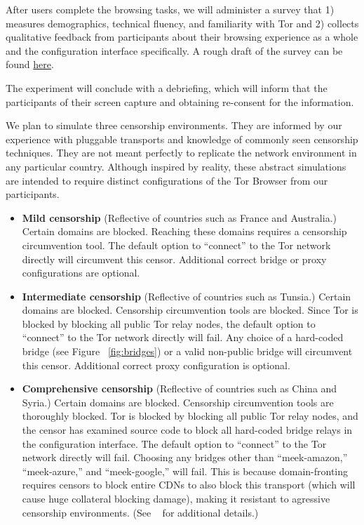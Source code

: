 \documentclass{template}
\begin{document}
After users complete the browsing tasks, we will administer a survey that 1)
measures demographics, technical fluency, and
familiarity with Tor and 2) collects qualitative feedback from
participants about their browsing experience as a whole
and the configuration interface specifically.
A rough draft of the survey can be
found
\href{http://www.surveygizmo.com/collab/2085559/Tor-Usability-Survey}{here}.

The experiment will conclude with a debriefing, which will inform that the
participants of their screen capture and obtaining re-consent for the
information. 

We plan to simulate three censorship environments.
They are informed by our experience with pluggable transports
and knowledge of commonly seen censorship techniques.
They are not meant perfectly to replicate the network environment
in any particular country. Although inspired by reality, these
abstract simulations are intended to require distinct configurations
of the Tor Browser from our participants. 

\begin{itemize} \itemsep1pt \parskip0pt 
\item {\bfseries Mild censorship} 
(Reflective of countries such as France and Australia.)
Certain domains are blocked. Reaching these 
domains requires a censorship circumvention 
tool. The default option to ``connect'' to the Tor network 
directly will circumvent this censor. Additional correct
bridge or proxy configurations are optional. 
\item {\bfseries Intermediate censorship} 
(Reflective of countries such as Tunsia.)
Certain domains are blocked. Censorship circumvention
tools are blocked. Since Tor is blocked by blocking all public Tor
relay nodes, the default option to ``connect'' to the Tor network
directly will fail. Any choice of a hard-coded bridge (see Figure ~\ref{fig:bridges})
or a valid non-public bridge will circumvent this censor.  
Additional correct proxy configuration is optional.
\item {\bfseries Comprehensive censorship} 
(Reflective of countries such as China and Syria.)
Certain domains are blocked. Censorship circumvention tools
are thoroughly blocked. Tor is blocked by blocking all public
Tor relay nodes, and the censor has examined source code to block
all hard-coded bridge relays in the configuration interface. The default option
to ``connect'' to the Tor network directly will fail. Choosing any bridges other than
``meek-amazon,'' ``meek-azure,'' and ``meek-google,'' will fail. This is because 
domain-fronting requires censors to block entire CDNs to also block this
transport (which will cause huge collateral blocking damage), making it resistant to agressive censorship environments.
(See ~\cite{fifield2015blocking} for additional details.)\\
\end{itemize}
\end{document}
